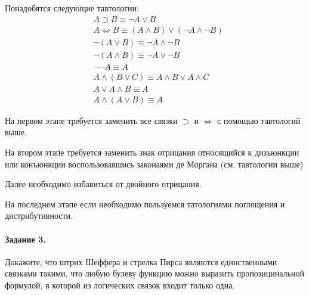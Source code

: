 \documentclass[a4paper,12pt]{article}
\begin{document}
\begin{Solution}
Понадобятся следующие тавтологии:
\[
	\begin{split}
		& A \supset B \equiv \neg A \lor B \\
		& A \Leftrightarrow B \equiv \left(A \land B\right) \lor \left(\neg A \land \neg B\right) \\
		& \neg \left(A \lor B\right) \equiv \neg A \land \neg B \\
		& \neg \left(A \land B\right) \equiv \neg A \lor \neg B \\
		& \neg \neg A \equiv A \\
		& A \land \left(B \lor C\right) \equiv A \land B \lor A \land C \\
		& A \lor A \land B \equiv A \\
		& A \land \left(A \lor B\right) \equiv A
	\end{split}
\]

На первом этапе требуется заменить все связки $\supset$ и $\Leftrightarrow$ с помощью тавтологий выше.

На втором этапе требуется заменить знак отрицания относящийся к дизъюнкции или конъюнкции воспользовавшись законаями де Моргана (см. тавтологии выше)

Далее необходимо избавиться от двойного отрицания.

На последнем этапе если необходимо пользуемся татологиями поглощения и дистрибутивности.
\end{Solution}

\paragraph{Задание 3.} Докажите, что штрих Шеффера и стрелка Пирса являются единственными связками такими, что любую булеву функцию можно выразить пропозицинальной формулой, в которой из логических связок входит только одна.
\end{document}

